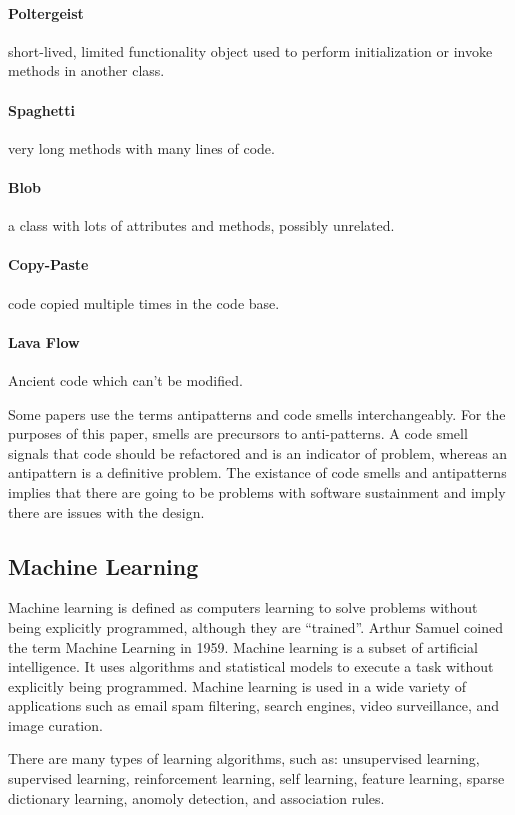 \documentclass[conference]{IEEEtran}
\begin{document}
\paragraph{Poltergeist} short-lived, limited functionality object used to perform initialization or invoke methods in another class.
\paragraph{Spaghetti} very long methods with many lines of code.
\paragraph{Blob} a class with lots of attributes and methods, possibly unrelated.
\paragraph{Copy-Paste} code copied multiple times in the code base.
\paragraph{Lava Flow} Ancient code which can't be modified.

Some papers use the terms antipatterns and code smells interchangeably\cite{singh_systematic_2018}. 
For the purposes of this paper, smells are precursors to anti-patterns. 
A code smell signals that code should be refactored and is an indicator of problem, whereas an antipattern is a definitive problem. 
The existance of code smells and antipatterns implies that there are going to be problems with software sustainment and imply there are issues with the design.


\subsection{Machine Learning}
Machine learning is defined as computers learning to solve problems without being explicitly programmed, although they are ``trained''\cite{bishop_pattern_2006}. 
Arthur Samuel coined the term Machine Learning in 1959\cite{samuel_studies_1988}.
Machine learning is a subset of artificial intelligence. 
It uses algorithms and statistical models to execute a task without explicitly being programmed.
Machine learning is used in a wide variety of applications such as email spam filtering, search engines, video surveillance, and image curation.

There are many types of learning algorithms, such as: unsupervised learning, supervised learning, reinforcement learning, self learning, feature learning, sparse dictionary learning, anomoly detection, and association rules.
\end{document}

